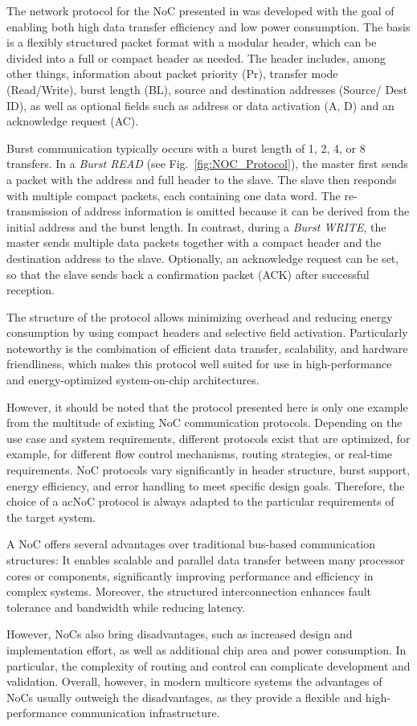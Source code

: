 The network protocol for the \ac{NoC} presented in \cite{lee_low-power_2006} was developed with the goal of enabling both high data transfer efficiency and low power consumption. The basis is a flexibly structured packet format with a modular header, which can be divided into a full or compact header as needed. The header includes, among other things, information about packet priority (Pr), transfer mode (Read/Write), burst length (BL), source and destination addresses (Source/ Dest ID), as well as optional fields such as address or data activation (A, D) and an acknowledge request (AC).

Burst communication typically occurs with a burst length of 1, 2, 4, or 8 transfers. In a \emph{Burst READ} (see Fig.~\ref{fig:NOC_Protocol}), the master first sends a packet with the address and full header to the slave. The slave then responds with multiple compact packets, each containing one data word. The re-transmission of address information is omitted because it can be derived from the initial address and the burst length. In contrast, during a \emph{Burst WRITE}, the master sends multiple data packets together with a compact header and the destination address to the slave. Optionally, an acknowledge request can be set, so that the slave sends back a confirmation packet (ACK) after successful reception.

The structure of the protocol allows minimizing overhead and reducing energy consumption by using compact headers and selective field activation. Particularly noteworthy is the combination of efficient data transfer, scalability, and hardware friendliness, which makes this protocol well suited for use in high-performance and energy-optimized system-on-chip architectures.

However, it should be noted that the protocol presented here is only one example from the multitude of existing \ac{NoC} communication protocols. Depending on the use case and system requirements, different protocols exist that are optimized, for example, for different flow control mechanisms, routing strategies, or real-time requirements. \ac{NoC} protocols vary significantly in header structure, burst support, energy efficiency, and error handling to meet specific design goals. Therefore, the choice of a ac{NoC} protocol is always adapted to the particular requirements of the target system.


A \ac{NoC} offers several advantages over traditional bus-based communication structures: It enables scalable and parallel data transfer between many processor cores or components, significantly improving performance and efficiency in complex systems. Moreover, the structured interconnection enhances fault tolerance and bandwidth while reducing latency.

However, \ac{NoC}s also bring disadvantages, such as increased design and implementation effort, as well as additional chip area and power consumption. In particular, the complexity of routing and control can complicate development and validation. Overall, however, in modern multicore systems the advantages of \ac{NoC}s usually outweigh the disadvantages, as they provide a flexible and high-performance communication infrastructure.\cite{dally_principles_2004}
